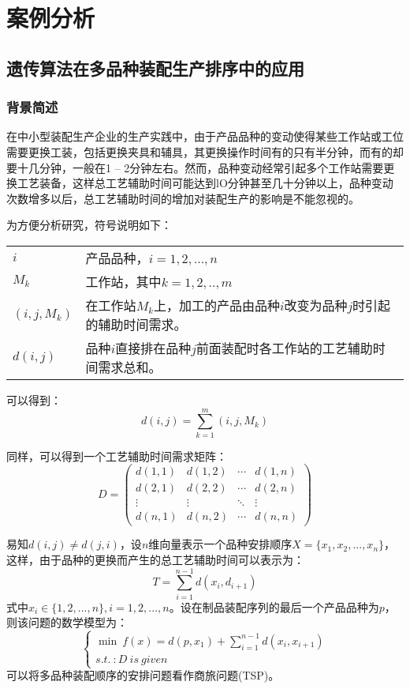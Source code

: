 \chapter{案例分析}
\section{遗传算法在多品种装配生产排序中的应用}
\subsection{背景简述}
在中小型装配生产企业的生产实践中，由于产品品种的变动使得某些工作站或工位需要更换工装，包括更换夹具和辅具，其更换操作时间有的只有半分钟，而有的却要十几分钟，一般在1 -- 2分钟左右。然而，品种变动经常引起多个工作站需要更换工艺装备，这样总工艺辅助时间可能达到lO分钟甚至几十分钟以上，品种变动次数增多以后，总工艺辅助时间的增加对装配生产的影响是不能忽视的。

为方便分析研究，符号说明如下：

\begin{tabular}{ll}
$i$ & 产品品种，$i = 1,2,...,n$\\
$M_k$ & 工作站，其中$k = 1,2,..,m$\\
$(i,j,M_k)$ & 在工作站$M_k$上，加工的产品由品种$i$改变为品种$j$时引起的辅助时间需求。\\
$d(i,j)$ & 品种$i$直接排在品种$j$前面装配时各工作站的工艺辅助时间需求总和。
\end{tabular}

可以得到：
\begin{equation}
d(i,j) = \sum_{k=1}^m (i,j,M_k) \label{equ:3}
\end{equation}

同样，可以得到一个工艺辅助时间需求矩阵：
\begin{equation}
D = \begin{pmatrix}
d(1,1) & d(1,2) & \cdots & d(1,n)\\
d(2,1) & d(2,2) & \cdots & d(2,n)\\
\vdots & \vdots & \ddots & \vdots\\
d(n,1) & d(n,2) & \cdots & d(n,n)
\end{pmatrix}
\end{equation}

易知$d(i,j) \neq d(j,i)$，设$n$维向量表示一个品种安排顺序$X = \{x_1,x_2,...,x_n\}$，这样，由于品种的更换而产生的总工艺辅助时间可以表示为：
\begin{equation}
T = \sum_{i = 1}^{n-1} d(x_i,d_{i+1})
\end{equation}
式中$x_i \in \{1,2,...,n\}, i = 1,2,...,n$。设在制品装配序列的最后一个产品品种为$p$，则该问题的数学模型为：
\begin{equation}
\begin{cases}
\min \  f(x) = d(p,x_1) + \displaystyle\sum_{i = 1}^{n-1} d(x_i,x_{i+1})\\
s.t.\ : D\ is\ given
\end{cases}
\end{equation}
可以将多品种装配顺序的安排问题看作商旅问题(TSP)。

